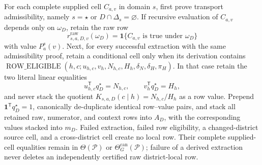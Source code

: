 For each complete supplied cell \(C_{a,v}\) in domain \(s\), first prove transport admissibility, namely \(s=\star\) or \(D\cap\Delta_s=\varnothing\).  If recursive evaluation of \(C_{a,v}\) depends only on \(\omega_D\), retain the raw row
\[
r^{\mathrm{raw}}_{s,a,D,v}(\omega_D)
=\mathbf 1\{C_{a,v}\text{ is true under }\omega_D\}
\]
with value \(P_a^s(v)\).  Next, for every successful extraction with the same admissibility proof, retain a conditional cell only when its derivation contains
\(\operatorname{ROW\_ELIGIBLE}(h,c;u_{h,c},v_h,N_{h,c},H_h,\delta_N,\delta_H,\pi_H)\).  In that case retain the two literal linear equalities
\[
u_{h,c}^{\mathsf T}q_D^\star=N_{h,c},
\qquad
v_h^{\mathsf T}q_D^\star=H_h,
\]
and never stack the quotient \(K_{s,a,D}(c\mid h)=N_{h,c}/H_h\) as a row value.  Prepend \(\mathbf 1^{\mathsf T}q_D^\star=1\), canonically de-duplicate identical row--value pairs, and stack all retained raw, numerator, and context rows into \(A_D\), with the corresponding values stacked into \(m_D\).  Failed extraction, failed row eligibility, a changed-district source cell, and a cross-district cell create no local row.  Their complete supplied-cell equalities remain in \(\Theta(\mathcal P)\) or \(\Theta_G^{\mathrm{can}}(\mathcal P)\); failure of a derived extraction never deletes an independently certified raw district-local row.